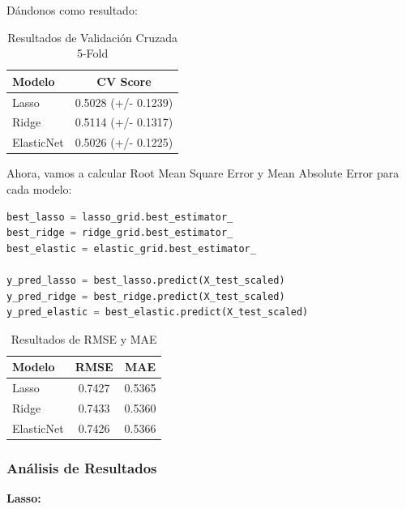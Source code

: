 \documentclass[12pt,a4paper]{article}
\begin{document}
\newpage

Dándonos como resultado: 

\begin{table}[H]
\centering
\caption{Resultados de Validación Cruzada 5-Fold}\label{tab:cross_validation_LRE}
\footnotesize
\begin{tabular}{lc}
\toprule
\textbf{Modelo} & \textbf{CV Score}\\
\midrule
Lasso & 0.5028 (+/- 0.1239) \\
Ridge & 0.5114 (+/- 0.1317) \\
ElasticNet & 0.5026 (+/- 0.1225) \\
\bottomrule
\end{tabular}
\end{table}

\vspace{0.5cm}

Ahora, vamos a calcular Root Mean Square Error y Mean Absolute Error para cada modelo:

\begin{lstlisting}[language=Python, frame=single, basicstyle=\ttfamily\small, breaklines=true]
best_lasso = lasso_grid.best_estimator_
best_ridge = ridge_grid.best_estimator_
best_elastic = elastic_grid.best_estimator_

y_pred_lasso = best_lasso.predict(X_test_scaled)
y_pred_ridge = best_ridge.predict(X_test_scaled)
y_pred_elastic = best_elastic.predict(X_test_scaled)
\end{lstlisting}

\begin{table}[H]
\centering
\caption{Resultados de RMSE y MAE}\label{tab:RMSE_MAE}
\footnotesize
\begin{tabular}{lcc}
\toprule
\textbf{Modelo} & \textbf{RMSE} & \textbf{MAE}\\
\midrule
Lasso & 0.7427 & 0.5365\\
Ridge & 0.7433 & 0.5360\\
ElasticNet & 0.7426 & 0.5366\\
\bottomrule
\end{tabular}
\end{table}

\subsubsection{Análisis de Resultados}

\vspace{0.5cm}

\textbf{Lasso:}
\end{document}

